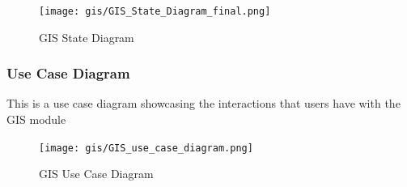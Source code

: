 \begin{figure}[H]

		\centering

		\texttt{[image: gis/GIS\_State\_Diagram\_final.png]}

		\caption{GIS State Diagram}

\end{figure}





\pagebreak



\subsubsection{Use Case Diagram}

This is a use case diagram showcasing the interactions that users have with the GIS module

\begin{figure}[H]

		\centering

		\texttt{[image: gis/GIS\_use\_case\_diagram.png]}

		\caption{GIS Use Case Diagram }

\end{figure}




